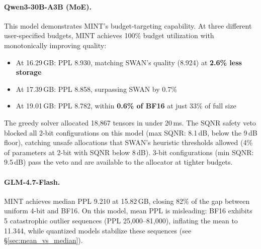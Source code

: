 \documentclass{article}
\begin{document}
\paragraph{Qwen3-30B-A3B (MoE).} This model demonstrates MINT's budget-targeting capability. At three different user-specified budgets, MINT achieves 100\% budget utilization with monotonically improving quality:
\begin{itemize}
    \item At 16.29\,GB: PPL 8.930, matching SWAN's quality (8.924) at \textbf{2.6\% less storage}
    \item At 17.39\,GB: PPL 8.858, surpassing SWAN by 0.7\%
    \item At 19.01\,GB: PPL 8.782, within \textbf{0.6\% of BF16} at just 33\% of full size
\end{itemize}
The greedy solver allocated 18{,}867 tensors in under 20\,ms. The SQNR safety veto blocked all 2-bit configurations on this model (max SQNR: 8.1\,dB, below the 9\,dB floor), catching unsafe allocations that SWAN's heuristic thresholds allowed (4\% of parameters at 2-bit with SQNR below 8\,dB). 3-bit configurations (min SQNR: 9.5\,dB) pass the veto and are available to the allocator at tighter budgets.

\paragraph{GLM-4.7-Flash.} MINT achieves median PPL 9.210 at 15.82\,GB, closing 82\% of the gap between uniform 4-bit and BF16. On this model, mean PPL is misleading: BF16 exhibits 5 catastrophic outlier sequences (PPL 25{,}000--81{,}000), inflating the mean to 11.344, while quantized models stabilize these sequences (see \S\ref{sec:mean_vs_median}).
\end{document}
